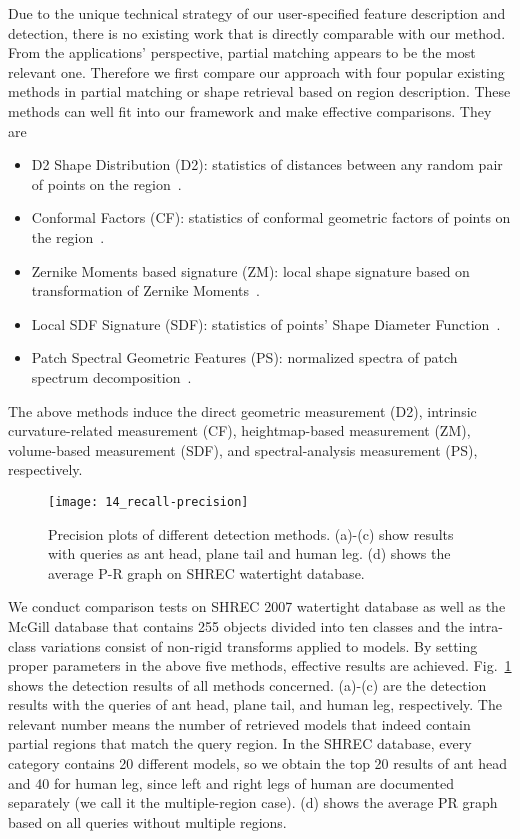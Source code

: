 Due to the unique technical strategy of our
user-specified feature description and detection, there is no
existing work that is directly comparable with our method. From the
applications' perspective, partial matching appears to be the most
relevant one. Therefore we first compare our approach
with four popular existing methods in partial matching or shape
retrieval based on region description. These methods can well
fit into our framework and make effective comparisons. They are

\begin{itemize}
\item D2 Shape Distribution (D2): statistics of distances between any
  random pair of points on the region~\cite{Osada:2002}.
\item Conformal Factors (CF): statistics of conformal geometric
  factors of points on the region~\cite{Ben-Chen:2008}.
  \item Zernike Moments based signature (ZM): local
    shape signature based on transformation of Zernike
    Moments~\cite{Maximo:2011:RRI:2027471}.
\item Local SDF Signature (SDF): statistics of points' Shape Diameter
  Function~\cite{Shapira:2010}.
\item Patch Spectral Geometric Features (PS): normalized spectra of
  patch spectrum decomposition~\cite{Hu2009}.
\end{itemize}
The above methods induce the direct geometric measurement (D2),
intrinsic curvature-related measurement (CF), heightmap-based
measurement (ZM), volume-based measurement (SDF), and spectral-analysis
measurement (PS), respectively.

\begin{figure}[!tbh]
\centering
\texttt{[image: 14\_recall-precision]}
\caption{Precision plots of different detection methods. (a)-(c) show
  results with queries as ant head, plane tail and human leg. (d)
  shows the average P-R graph on SHREC watertight database.}
\label{PR}
\end{figure}

We conduct comparison tests on SHREC 2007 watertight database as well
as the McGill database that contains 255 objects divided into ten
classes and the intra-class variations consist of non-rigid transforms
applied to models. By setting proper parameters in the above five
methods, effective results are achieved. Fig.~\ref{PR} shows the
detection results of all methods concerned. (a)-(c) are the detection
results with the queries of ant head, plane tail, and human leg,
respectively. The relevant number means the number of retrieved models
that indeed contain partial regions that match the query region. In the
SHREC database, every category contains 20 different models, so we
obtain the top 20 results of ant head and 40 for human leg, since left
and right legs of human are documented separately (we call it the
multiple-region case). (d) shows the average PR graph based on all
queries without multiple regions.

